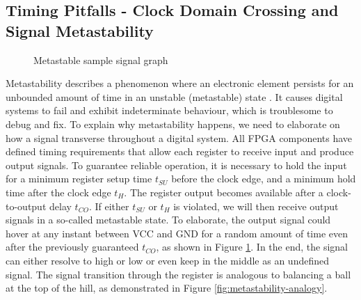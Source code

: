 \documentclass[a4paper]{report}
\begin{document}
\subsection{Timing Pitfalls - Clock Domain Crossing and Signal Metastability}
\label{section:implementation-hardware-implementation-metastability}

\begin{figure}[h!]
  \caption{Metastable sample signal graph \cite{stephenson-2009}}
  \label{fig:metastability-clock}
\end{figure}

Metastability describes a phenomenon where an electronic element persists for an unbounded amount of time in an unstable (metastable) state \cite{chaney-1973}. It causes digital systems to fail and exhibit indeterminate behaviour, which is troublesome to debug and fix. To explain why metastability happens, we need to elaborate on how a signal transverse throughout a digital system. All FPGA components have defined timing requirements that allow each register to receive input and produce output signals. To guarantee reliable operation, it is necessary to hold the input for a minimum register setup time $t_{SU}$ before the clock edge, and a minimum hold time after the clock edge $t_{H}$. The register output becomes available after a clock-to-output delay $t_{CO}$. If either $t_{SU}$ or $t_{H}$ is violated, we will then receive output signals in a so-called metastable state. To elaborate, the output signal could hover at any instant between VCC and GND for a random amount of time even after the previously guaranteed $t_{CO}$, as shown in Figure \ref{fig:metastability-clock}. In the end, the signal can either resolve to high or low or even keep in the middle as an undefined signal. The signal transition through the register is analogous to balancing a ball at the top of the hill, as demonstrated in Figure \ref{fig:metastability-analogy}.
\end{document}
